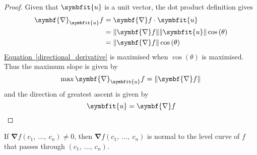 \documentclass{article}
\begin{document}
\begin{proof}
    Given that \(\symbfit{u}\) is a unit vector, the dot product definition
    gives
    \begin{align}
        \symbf{\nabla}_{\symbfit{u}}f & = \symbf{\nabla}f \cdot \symbfit{u} \nonumber                                       \\
                                      & = \norm{\symbf{\nabla}f} \norm{\symbfit{u}} \cos{\left( \theta \right)} \nonumber   \\
                                      & = \norm{\symbf{\nabla}f} \cos{\left( \theta \right)} \label{directional_derivative}
    \end{align}
    \hyperref[directional_derivative]{Equation~\ref{directional_derivative}} is
    maximised when \(\cos{\left( \theta \right)}\) is maximised. Thus the
    maximum slope is given by
    \begin{equation*}
        \max \symbf{\nabla}_{\symbfit{u}}f = \norm{\symbf{\nabla}f}
    \end{equation*}
    and the direction of greatest ascent is given by
    \begin{equation*}
        \symbfit{u} = \symbf{\nabla}f
    \end{equation*}
\end{proof}
\begin{theorem}
    If \(\symbf{\nabla}f(c_1,\: \ldots,\: c_n) \neq 0\), then \(\symbf{\nabla}f(c_1,\: \ldots,\: c_n)\) is normal to the level
    curve of \(f\) that passes through \((c_1,\: \ldots,\: c_n)\).
\end{theorem}
\end{document}
